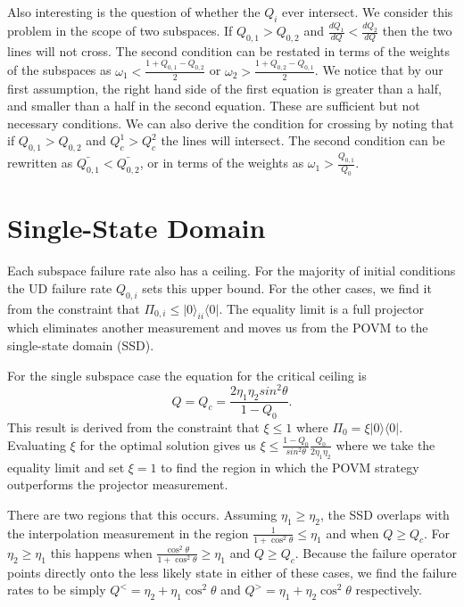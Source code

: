 \documentclass[12pt,oneside,english,reqno]{amsbook}
\numberwithin{section}{chapter}
\numberwithin{equation}{section}
\numberwithin{figure}{section}
\begin{document}
Also interesting is the question of whether the $Q_i$ ever intersect.  We consider this problem in the scope of two subspaces.  If $Q_{0,1} > Q_{0,2}$ and $\frac{d Q_1}{d Q} < \frac{d Q_2}{d Q}$ then the two lines will not cross.  The second condition can be restated in terms of the weights of the subspaces as $\omega_1 < \frac{1+Q_{0,1} - Q_{0,2}}{2}$ or  $\omega_2 > \frac{1+Q_{0,2} - Q_{0,1}}{2}$.  We notice that by our first assumption, the right hand side of the first equation is greater than a half, and smaller than a half in the second equation.  These are sufficient but not necessary conditions. We can also derive the condition for crossing by noting that if $Q_{0,1} > Q_{0,2}$ and $ Q^1_c > Q^2_c$ the lines will intersect.  The second condition can be rewritten as $\bar{Q_{0,1}} < \bar{Q_{0,2}}$, or in terms of the weights as $\omega_1 > \frac{Q_{0,1}}{Q_0}$.


\section{Single-State Domain}

Each subspace failure rate also has a ceiling.  For the majority of initial conditions the UD failure rate $Q_{0,i}$ sets this upper bound.  For the other cases, we find it from the constraint that $\Pi_{0,i} \leq \vert 0 \rangle_{ii} \langle 0 \vert $.  The equality limit is a full projector which eliminates another measurement and moves us from the POVM to the single-state domain (SSD).

For the single subspace case the equation for the critical ceiling is
\begin{equation} Q = Q_c = \frac{2\eta_1\eta_2 sin^2 \theta}{1-Q_0}.\end{equation}
This result is derived from the constraint that $\xi \leq 1$ where $ \Pi_0 = \xi \vert 0 \rangle \langle 0 \vert$.  Evaluating $\xi$ for the optimal solution gives us $\xi \leq \frac{1-Q_0}{sin^2 \theta} \frac{Q_0}{2 \eta_1 \eta_2}$ where we take the equality limit and set $\xi = 1$ to find the region in which the POVM strategy outperforms the projector measurement. 

There are two regions that this occurs. Assuming $\eta_1 \geq \eta_2$, the SSD overlaps with the interpolation measurement in the region $\frac{1}{1 + \cos^2 \theta} \leq \eta_1$ and when $Q \geq Q_c$.  For $\eta_2 \geq \eta_1$ this happens when $\frac{\cos^2 \theta}{1+\cos^2\theta} \geq \eta_1$ and  $Q \geq Q_c$.  Because the failure operator points directly onto the less likely state in either of these cases, we find the failure rates to be simply $Q^<= \eta_2 + \eta_1 \cos^2 \theta$ and $Q^> = \eta_1 + \eta_2 \cos^2 \theta$ respectively. 
\end{document}

